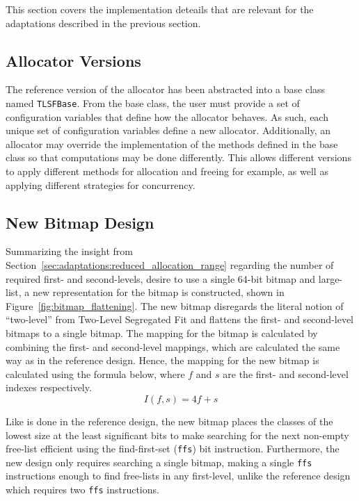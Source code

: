 
This section covers the implementation deteails that are relevant for the adaptations described in the previous section.

\subsection{Allocator Versions}

The reference version of the allocator has been abstracted into a base class named \texttt{TLSFBase}. From the base class, the user must provide a set of configuration variables that define how the allocator behaves. As such, each unique set of configuration variables define a new allocator. Additionally, an allocator may override the implementation of the methods defined in the base class so that computations may be done differently. This allows different versions to apply different methods for allocation and freeing for example, as well as applying different strategies for concurrency.

\subsection{New Bitmap Design}

Summarizing the insight from Section~\ref{sec:adaptations:reduced_allocation_range} regarding the number of required first- and second-levels, desire to use a single 64-bit bitmap and large-list, a new representation for the bitmap is constructed, shown in Figure~\ref{fig:bitmap_flattening}. The new bitmap disregards the literal notion of ``two-level'' from Two-Level Segregated Fit and flattens the first- and second-level bitmaps to a single bitmap. The mapping for the bitmap is calculated by combining the first- and second-level mappings, which are calculated the same way as in the reference design. Hence, the mapping for the new bitmap is calculated using the formula below, where $f$ and $s$ are the first- and second-level indexes respectively.
\[
    I(f, s) = 4f + s
\]

Like is done in the reference design, the new bitmap places the classes of the lowest size at the least significant bits to make searching for the next non-empty free-list efficient using the find-first-set (\texttt{ffs}) bit instruction. Furthermore, the new design only requires searching a single bitmap, making a single \texttt{ffs} instructions enough to find free-lists in any first-level, unlike the reference design which requires two \texttt{ffs} instructions.

